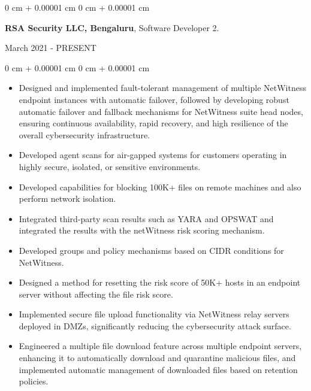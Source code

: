 \documentclass[10pt, letterpaper]{article}
\newenvironment{highlights}{
    \begin{itemize}[
        topsep=0.10 cm,
        parsep=0.10 cm,
        partopsep=0pt,
        itemsep=0pt,
        leftmargin=0 cm + 10pt
    ]
}{
    \end{itemize}
} %
\newenvironment{onecolentry}{
    \begin{adjustwidth}{
        0 cm + 0.00001 cm
    }{
        0 cm + 0.00001 cm
    }
}{
    \end{adjustwidth}
} %
\newenvironment{twocolentry}[2][]{
    \onecolentry
    \def\secondColumn{#2}
    \setcolumnwidth{\fill, 4.5 cm}
    \begin{paracol}{2}
}{
    \switchcolumn \raggedleft \secondColumn
    \end{paracol}
    \endonecolentry
} %
\begin{document}
        \begin{twocolentry}{March 2021 - PRESENT}
          \textbf{RSA Security LLC, Bengaluru}, Software Developer 2.
        \end{twocolentry}
        \vspace{0.10 cm}
        \begin{onecolentry}
            \begin{highlights}
                \item Designed and implemented fault-tolerant management of multiple NetWitness endpoint instances with automatic failover, followed by developing robust automatic failover and fallback mechanisms for NetWitness suite head nodes, ensuring continuous availability, rapid recovery, and high resilience of the overall cybersecurity infrastructure.
                \item Developed agent scans for air-gapped systems for customers operating in highly secure, isolated, or sensitive environments.
                \item Developed capabilities for blocking 100K+ files on remote machines and also perform network isolation.
                \item Integrated third-party scan results such as YARA and OPSWAT and integrated the results with the netWitness risk scoring mechanism.
               \item Developed groups and policy mechanisms based on CIDR conditions for NetWitness.
              \item Designed a method for resetting the risk score of 50K+ hosts in an endpoint server without affecting the file risk score.
              \item Implemented secure file upload functionality via NetWitness relay servers deployed in DMZs, significantly reducing the cybersecurity attack surface.
              \item Engineered a multiple file download feature across multiple endpoint servers, enhancing it to automatically download and quarantine malicious files, and implemented automatic management of downloaded files based on retention policies.
            \end{highlights}
        \end{onecolentry}

        \vspace{0.2 cm}
\end{document}
